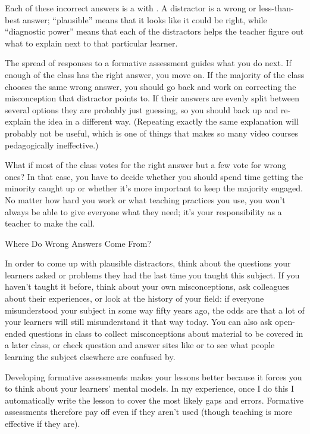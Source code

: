 Each of these incorrect answers is a 
with .
A distractor is a wrong or less-than-best answer;
``plausible'' means that it looks like it could be right,
while ``diagnostic power'' means that each of the distractors helps the teacher figure out
what to explain next to that particular learner.

The spread of responses to a formative assessment guides what you do next.
If enough of the class has the right answer, you move on.
If the majority of the class chooses the same wrong answer,
you should go back and work on correcting the misconception that distractor points to.
If their answers are evenly split between several options they are probably just guessing,
so you should back up and re-explain the idea in a different way.
(Repeating exactly the same explanation will probably not be useful,
which is one of things that makes so many video courses pedagogically ineffective.)

What if most of the class votes for the right answer
but a few vote for wrong ones?
In that case,
you have to decide whether you should spend time getting the minority caught up
or whether it's more important to keep the majority engaged.
No matter how hard you work or what teaching practices you use,
you won't always be able to give everyone what they need;
it's your responsibility as a teacher to make the call.

\begin{aside}{Where Do Wrong Answers Come From?}

  In order to come up with plausible distractors,
  think about the questions your learners asked or problems they had
  the last time you taught this subject.
  If you haven't taught it before,
  think about your own misconceptions,
  ask colleagues about their experiences,
  or look at the history of your field:
  if everyone misunderstood your subject in some way fifty years ago,
  the odds are that a lot of your learners will still misunderstand it that way today.
  You can also ask open-ended questions in class
  to collect misconceptions about material to be covered in a later class,
  or check question and answer sites like  or 
  to see what people learning the subject elsewhere are confused by.

\end{aside}

Developing formative assessments makes your lessons better
because it forces you to think about your learners' mental models.
In my experience,
once I do this I automatically write the lesson to cover the most likely gaps and errors.
Formative assessments therefore pay off even if they aren't used
(though teaching is more effective if they are).

